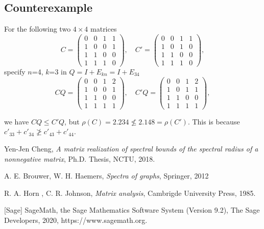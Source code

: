 \documentclass{article}
\theoremstyle{plain}
\theoremstyle{definition}
\begin{document}
\subsection{Counterexample}
    For the following two $4\times 4$ matrices
    $$C=\begin{pmatrix}
    0 & 0 & 1 & 1\\
    1 & 0 & 0 & 1\\
    1 & 1 & 0 & 0\\
    1 & 1 & 1 & 0
    \end{pmatrix},\quad C'=\begin{pmatrix}
    0 & 0 & 1 & 1\\
    1 & 0 & 1 &  0\\
    1 & 1 & 0 & 0\\
    1 & 1 & 1 & 0
    \end{pmatrix},$$ 
    specify $n$=4, $k$=3 in $Q = I +E_{kn} = I + E_{34}$  
    $$CQ=\begin{pmatrix}
    0 & 0 & 1 & 2\\
    1 & 0 & 0 & 1\\
    1 & 1 & 0 & 0\\
    1 & 1 & 1 & 1
    \end{pmatrix},\quad C'Q=\begin{pmatrix}
    0 & 0 & 1 & 2\\
    1 & 0 & 1 & 1\\
    1 & 1 & 0 & 0\\
    1 & 1 & 1 & 1
    \end{pmatrix},$$

    we have $CQ\leq C'Q$, but 
    $\rho(C)=2.234\not\leq 2.148= \rho(C')$. 
    This is because $c'_{33}+c'_{34}\not\geq c'_{43}+c'_{44}$. 


    

\begin{thebibliography}{20}
\normalsize
{}

Yen-Jen Cheng, {\it  A matrix realization of spectral bounds
of the spectral radius of a nonnegative matrix}, Ph.D. Thesis, NCTU, 2018.

A. E. Brouwer, W. H. Haemers, {\it Spectra of graphs}, Springer, 2012

R. A. Horn , C. R. Johnson, {\it Matrix analysis}, Cambrigde University Press, 1985.

[Sage] SageMath, the Sage Mathematics Software System (Version 9.2),
       The Sage Developers, 2020, https://www.sagemath.org.  %

\end{thebibliography}
\end{document}
